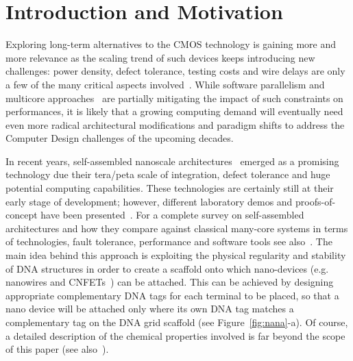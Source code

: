 
\section{Introduction and Motivation}
\label{sec:introduction}

Exploring long-term alternatives to the CMOS technology is gaining
more and more relevance as the scaling trend of such devices keeps
introducing new challenges: power density, defect tolerance, testing
costs and wire delays are only a few of the many critical aspects
involved~\cite{itrs13}. 
While software parallelism and multicore
approaches~\cite{Kavi2012243,Sibai2011958} are partially mitigating the impact of such
constraints on performances, it is likely that a growing computing demand will
eventually need even more radical architectural modifications and 
paradigm shifts to address the Computer Design challenges of the upcoming
decades.

In recent years, self-assembled nanoscale
architectures~\cite{yan2003} emerged as a promising technology due
their tera/peta scale of integration, defect tolerance and huge
potential computing capabilities. These technologies are certainly
still at their early stage of development; however, different
laboratory demos and proofs-of-concept have been
presented~\cite{patwardhan2006_1, pistol2009}. For a complete survey on self-assembled architectures and
how they compare against classical many-core systems in terms of
 technologies, fault tolerance, performance and software tools see
 also~\cite{Future}.
The main idea behind this approach is exploiting the physical
regularity and stability of DNA structures in order to create a
scaffold onto which nano-devices (e.g. nanowires and
CNFETs~\cite{bachtold2001, cui2001}) can be attached. This
can be achieved by designing appropriate complementary DNA tags for
each terminal to be placed, so that a nano device will be attached
only where its own DNA tag matches a complementary tag on the DNA grid
scaffold (see Figure~\ref{fig:nana}-a).  Of course, a detailed
description of the chemical properties involved is far beyond the
scope of this paper (see also~\cite{seeman1999}). 

